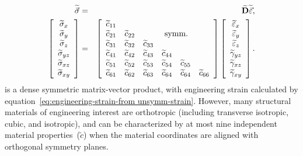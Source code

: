 \documentclass[]             %
{NASA}                       %
\begin{document}
\begin{eqnarray}
\widetilde{\vec{\mathbf{\sigma}}} & = & \widetilde{\mathbf{D}}\widetilde{\vec{\mathbf{\varepsilon}}}\text{,}\label{eq:mtrl-d-matrix}{}\\
\left[\begin{array}{c}
\widetilde{\sigma}_{x}\\
\widetilde{\sigma}_{y}\\
\widetilde{\sigma}_{z}\\
\widetilde{\sigma}_{yz}\\
\widetilde{\sigma}_{xz}\\
\widetilde{\sigma}_{xy}
\end{array}\right] & = & \left[\begin{array}{cccccc}
%
\widetilde{c}_{11} & & & & &\\
\widetilde{c}_{21} & \widetilde{c}_{22} & & \multicolumn{2}{c}{\text{symm.}} &\\
\widetilde{c}_{31} & \widetilde{c}_{32} & \widetilde{c}_{33} & & &\\
\widetilde{c}_{41} & \widetilde{c}_{42} & \widetilde{c}_{43} & \widetilde{c}_{44} & &\\
\widetilde{c}_{51} & \widetilde{c}_{52} & \widetilde{c}_{53} & \widetilde{c}_{54} & \widetilde{c}_{55} &\\
\widetilde{c}_{61} & \widetilde{c}_{62} & \widetilde{c}_{63} & \widetilde{c}_{64} & \widetilde{c}_{64} &  \widetilde{c}_{66}
%
%
\end{array}\right]\left[\begin{array}{c}
\widetilde{\varepsilon}_{x}\\
\widetilde{\varepsilon}_{y}\\
\widetilde{\varepsilon}_{z}\\
\widetilde{\gamma}_{yz}\\
\widetilde{\gamma}_{xz}\\
\widetilde{\gamma}_{xy}\nonumber\label{eq:stress-from-engineering-strain-material}
\end{array}\right]\text{.}
\end{eqnarray}
is a dense symmetric matrix-vector product, with
engineering strain calculated by equation~\ref{eq:engineering-strain-from unsymm-strain}.
However, many structural materials of engineering interest are orthotropic (including transverse isotropic, cubic, and isotropic),
and can be characterized by at most nine independent material properties~($\widetilde{c}$)
when the material coordinates are aligned with orthogonal symmetry planes. 
\end{document}
